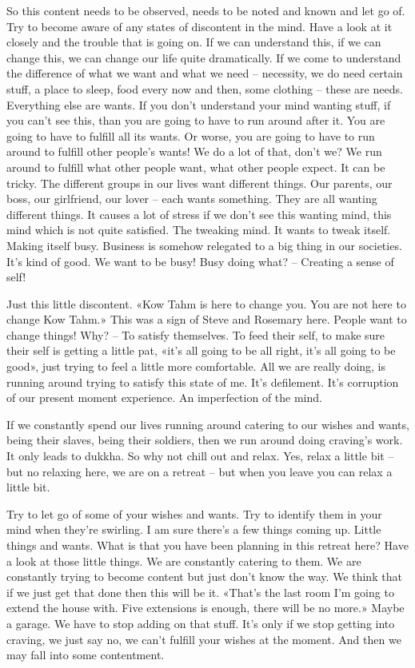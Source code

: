 \documentclass[letterpaper,10pt,english]{sphinxmanual}
\begin{document}
\sphinxAtStartPar
So this content needs to be observed, needs to be noted and known and
let go of. Try to become aware of any states of discontent in the mind. Have a
look at it closely and the trouble that is going on. If we can understand this, if
we can change this, we can change our life quite dramatically. If we come to
understand the difference of what we want and what we need – necessity, we
do need certain stuff, a place to sleep, food every now and then, some clothing  –  these  are  needs.  Everything  else  are  wants.  If  you  don’t  understand
your mind wanting stuff, if you can’t see this, than you are going to have to
run around after it. You are going to have to fulfill all its wants. Or worse,
you are going to have to run around to fulfill other people’s wants! We do a
lot of that, don’t we? We run around to fulfill what other people want, what
other people expect. It can be tricky. The different groups in our lives want
different things. Our parents, our boss, our girlfriend, our lover – each wants
something.  They  are  all  wanting  different  things.  It  causes  a  lot  of  stress
if  we  don’t  see  this  wanting  mind,  this  mind  which  is  not  quite  satisfied.
The tweaking mind. It wants to tweak itself. Making itself busy. Business is
somehow relegated to a big thing in our societies. It’s kind of good. We want
to be busy! Busy doing what? – Creating a sense of self!

\sphinxAtStartPar
Just this little discontent. «Kow Tahm is here to change you. You are
not here to change Kow Tahm.» This was a sign of Steve and Rosemary here.
People want to change things! Why? – To satisfy themselves. To feed their
self, to make sure their self is getting a little pat, «it’s all going to be all right,
it’s all going to be good», just trying to feel a little more comfortable. All
  we are really doing, is running around trying to satisfy this state of me. It’s
defilement. It’s corruption of our present moment experience. An imperfection of the mind.

\sphinxAtStartPar
If we constantly spend our lives running around catering to our wishes
and wants, being their slaves, being their soldiers, then we run around doing
craving’s work. It only leads to dukkha. So why not chill out and relax. Yes,
relax a little bit – but no relaxing here, we are on a retreat – but when you
leave you can relax a little bit.

\sphinxAtStartPar
Try to let go of some of your wishes and wants. Try to identify them in
your mind when they’re swirling. I am sure there’s a few things coming up.
Little things and wants. What is that you have been planning in this retreat
here? Have a look at those little things. We are constantly catering to them.
We are constantly trying to become content but just don’t know the way. We
think that if we just get that done then this will be it. «That’s the last room
I’m going to extend the house with. Five extensions is enough, there will be
no more.» Maybe a garage. We have to stop adding on that stuff. It’s only if
we stop getting into craving, we just say no, we can’t fulfill your wishes at
the moment. And then we may fall into some contentment.
\end{document}
